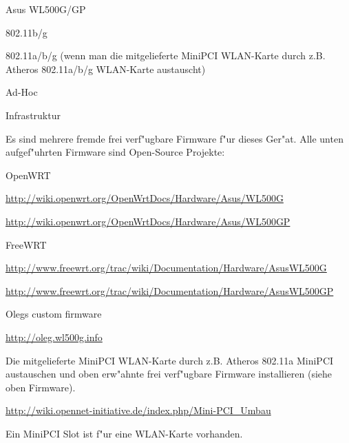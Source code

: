 %
%
\begin{wlandevice}{Asus WL500G/GP}


\begin{wlanieeestandard}
\item 802.11b/g
\item 802.11a/b/g (wenn man die mitgelieferte MiniPCI WLAN-Karte
durch z.B. Atheros 802.11a/b/g WLAN-Karte austauscht)
\end{wlanieeestandard}

\begin{wlanmode}
\item Ad-Hoc
\item Infrastruktur
\end{wlanmode}

\begin{wlanfirmware}
\item
Es sind mehrere fremde frei verf"ugbare Firmware f"ur dieses Ger"at.
Alle unten aufgef"uhrten Firmware sind Open-Source Projekte:

OpenWRT

\url{http://wiki.openwrt.org/OpenWrtDocs/Hardware/Asus/WL500G}

\url{http://wiki.openwrt.org/OpenWrtDocs/Hardware/Asus/WL500GP}

FreeWRT

\url{http://www.freewrt.org/trac/wiki/Documentation/Hardware/AsusWL500G}

\url{http://www.freewrt.org/trac/wiki/Documentation/Hardware/AsusWL500GP}

Olegs custom firmware

\url{http://oleg.wl500g.info}
\end{wlanfirmware}


\begin{wlaninstall}
\item
Die mitgelieferte MiniPCI WLAN-Karte durch z.B. Atheros 802.11a MiniPCI
austauschen und oben erw"ahnte frei verf"ugbare Firmware installieren
(siehe oben Firmware).

\url{http://wiki.opennet-initiative.de/index.php/Mini-PCI_Umbau}
\end{wlaninstall}

\begin{wlanextrainfo}
\item
Ein MiniPCI Slot ist f"ur eine WLAN-Karte vorhanden.
\end{wlanextrainfo}


\end{wlandevice}
